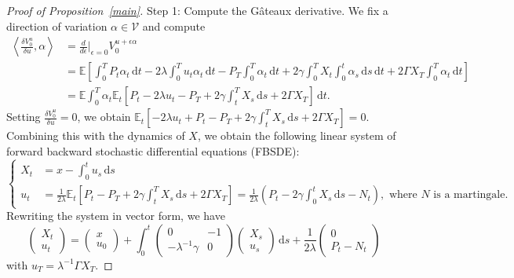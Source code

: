 \documentclass[openany,oneside]{article}
\theoremstyle{definition}
\theoremstyle{remark}
\newcommand{\E}{\mathbb{E}} %
\newcommand{\ts}{\textstyle}
\newcommand{\de}{\,\mathrm{d}}
\begin{document}
\begin{proof}[Proof of Proposition~\ref{main}]
Step 1: Compute the G\^ateaux derivative. We fix a direction of variation $\alpha \in \mathcal{V}$ and compute
\begin{align*}
\ts\left\langle \frac{\delta V^u_0}{\delta u}, \alpha \right\rangle &\ts= \frac{d}{d\epsilon}\Big\vert_{\epsilon=0} V^{u+\epsilon\alpha}_0  \\
&\ts= \E\left[\int_0^T P_t \alpha_t \de t - 2\lambda\int_0^T u_t \alpha_t \de t - P_T \int_0^T \alpha_t \de t + 2\gamma\int_0^T X_t \int_0^t \alpha_s \de s \de t + 2\Gamma X_T \int_0^T \alpha_t \de t \right] \\
&\ts= \E\int_0^T \alpha_t \E_t\left[P_t - 2\lambda u_t - P_T + 2\gamma\int_t^T X_s \de s + 2\Gamma X_T \right] \de t.
\end{align*}
Setting $\frac{\delta V^u_0}{\delta u}=0$, we obtain $\E_t[-2\lambda u_t + P_t - P_T + 2\gamma\int_t^T X_s \de s + 2\Gamma X_T ] = 0$. Combining this with the dynamics of $X$, we obtain the following linear system of forward backward stochastic differential equations (FBSDE):
\[
\begin{cases}
X_t &= x-\int_0^t u_s \de s \\
u_t &= \frac{1}{2\lambda}\E_t\left[P_t-P_T+2\gamma\int_t^T X_s \de s + 2\Gamma X_T\right] = \frac{1}{2\lambda}\left(P_t-2\gamma\int_0^t X_s \de s - N_t\right), \textrm{ where $N$ is a martingale.} 
\end{cases}
\]
Rewriting the system in vector form, we have
\[
\begin{pmatrix} X_t \\ u_t \end{pmatrix} = \begin{pmatrix} x \\ u_0 \end{pmatrix} + \int_0^t \begin{pmatrix} 0 & -1 \\ -\lambda^{-1}\gamma & 0 \end{pmatrix} \begin{pmatrix} X_s \\ u_s \end{pmatrix} \de s + \frac{1}{2\lambda}\begin{pmatrix} 0 \\ P_t - N_t \end{pmatrix}
\]
with $u_T = \lambda^{-1}\Gamma X_T$.


\end{proof}
\end{document}
